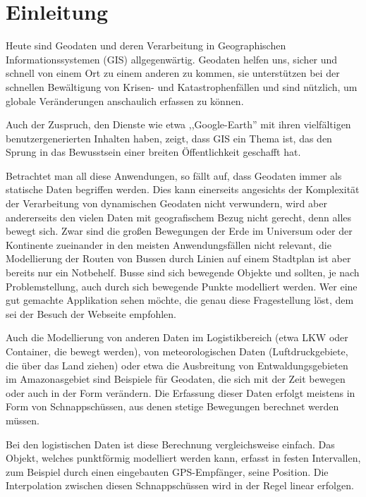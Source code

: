 
\chapter[Einleitung]{Einleitung} \label{Kapitel1}


Heute sind Geodaten und deren Verarbeitung  in Geographischen Informationssystemen (GIS) allgegenwärtig. Geodaten helfen uns, sicher und schnell von einem Ort zu einem anderen zu kommen, sie unterstützen bei der schnellen Bewältigung von Krisen- und Katastrophenfällen und sind nützlich, um globale Veränderungen anschaulich erfassen zu können.

Auch der Zuspruch, den Dienste wie etwa ,,Google-Earth'' mit ihren vielfältigen benutzer\-generierten Inhalten haben, zeigt, dass GIS ein Thema ist, das den Sprung in das Bewusstsein einer breiten Öffentlichkeit geschafft hat. 

Betrachtet man all diese Anwendungen, so fällt auf, dass Geodaten immer als statische Daten begriffen werden. Dies kann einerseits angesichts der Komplexität der Verarbeitung von dynamischen Geodaten nicht verwundern, wird aber andererseits den vielen Daten mit geografischem Bezug nicht gerecht, denn alles bewegt sich. Zwar sind die großen Bewegungen der Erde im Universum oder der Kontinente zueinander in den meisten Anwendungsfällen nicht relevant, die Modellierung der Routen von Bussen durch Linien auf einem Stadtplan ist aber bereits nur ein Notbehelf. Busse sind sich bewegende Objekte und sollten, je nach Problemstellung, auch durch sich bewegende Punkte modelliert werden. Wer eine gut gemachte Applikation sehen möchte, die genau diese Fragestellung löst, dem sei der Besuch der Webseite \cite{swR} empfohlen.

Auch die Modellierung von anderen Daten im Logistikbereich (etwa LKW oder Container, die bewegt werden), von meteorologischen Daten (Luftdruckgebiete, die über das Land ziehen) oder etwa die Ausbreitung von Entwaldungsgebieten im Amazonasgebiet sind Beispiele für Geodaten, die sich mit der Zeit bewegen oder auch in der Form verändern. Die Erfassung dieser  Daten erfolgt meistens in Form von Schnappschüssen, aus denen stetige Bewegungen berechnet werden müssen. 

Bei den logistischen Daten ist diese Berechnung vergleichsweise  einfach. Das Objekt, welches punktförmig modelliert werden kann, erfasst in festen Intervallen, zum Beispiel durch einen eingebauten GPS-Empfänger, seine Position.  Die Interpolation zwischen diesen Schnappschüssen wird in der Regel linear erfolgen. 

